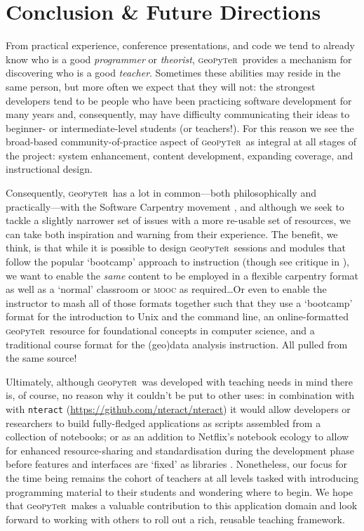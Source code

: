 \documentclass[letter, 11pt,titlepage]{article}
\newcommand{\gp}{\textsc{g}eo\textsc{p}y\textsc{t}e\textsc{r}~\/}
\begin{document}
\section{Conclusion \& Future Directions}\label{future}

From practical experience, conference presentations, and code we tend to already
know who is a good \emph{programmer} or \emph{theorist}, \gp provides a
mechanism for discovering who is a good \emph{teacher}. Sometimes these
abilities may reside in the same person, but more often we expect that they will
not: the strongest developers tend to be people who have been practicing
software development for many years and, consequently, may have difficulty
communicating their ideas to beginner- or intermediate-level students (or
teachers!). For this reason we see the broad-based community-of-practice aspect
of \gp as integral at all stages of the project: system enhancement, content
development, expanding coverage, and instructional design.

Consequently, \gp has a lot in common---both philosophically and
practically---with the Software Carpentry movement \citep{SCF2016}, and although
we seek to tackle a slightly narrower set of issues with a more re-usable set of
resources, we can take both inspiration and warning from their experience. The
benefit, we think, is that while it is possible to design \gp sessions and
modules that follow the popular `bootcamp' approach to instruction (though see
critique in \citealp{Feldon2017}), we want to enable the \textit{same} content
to be employed in a flexible carpentry format as well as a `normal' classroom or
\textsc{mooc} as required\ldots Or even to enable the instructor to mash all of
those formats together such that they use a `bootcamp' format for the
introduction to Unix and the command line, an online-formatted \gp resource for
foundational concepts in computer science, and a traditional course format for
the (geo)data analysis instruction. All pulled from the same source!

Ultimately, although \gp was developed with teaching needs in mind there is, of
course, no reason why it couldn't be put to other uses: in combination with with
\texttt{nteract} (\url{https://github.com/nteract/nteract}) it would allow
developers or researchers to build fully-fledged applications as scripts
assembled from a collection of notebooks; or as an addition to Netflix's
notebook ecology to allow for enhanced resource-sharing and standardisation
during the development phase before features and interfaces are `fixed' as
libraries \citep{Ufford2018}. Nonetheless, our focus for the time being remains
the cohort of teachers at all levels tasked with introducing programming
material to their students and wondering where to begin. We hope that \gp makes
a valuable contribution to this application domain and look forward to working
with others to roll out a rich, reusable teaching framework.



\end{document}
